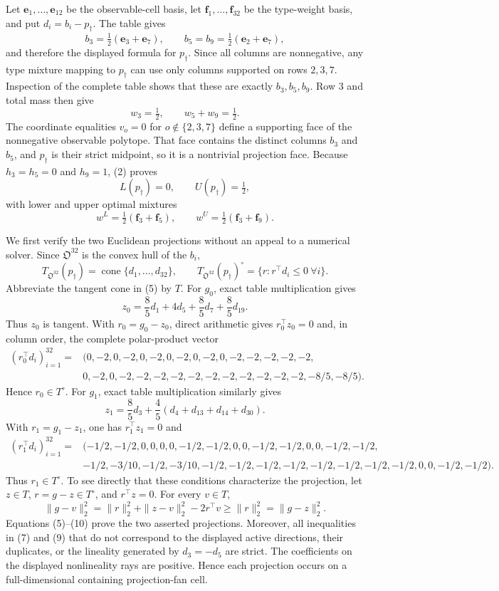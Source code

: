 Let \(\mathbf e_1,\ldots,\mathbf e_{12}\) be the observable-cell basis, let \(\mathbf f_1,\ldots,\mathbf f_{32}\) be the type-weight basis, and put \(d_i=b_i-p_\dagger\).  The table gives
\[
b_3=\tfrac12(\mathbf e_3+\mathbf e_7),
\qquad
b_5=b_9=\tfrac12(\mathbf e_2+\mathbf e_7),
\tag{1}
\]
and therefore the displayed formula for \(p_\dagger\).  Since all columns are nonnegative, any type mixture mapping to \(p_\dagger\) can use only columns supported on rows \(2,3,7\).  Inspection of the complete table shows that these are exactly \(b_3,b_5,b_9\).  Row \(3\) and total mass then give
\[
w_3=\tfrac12,\qquad w_5+w_9=\tfrac12.
\tag{2}
\]
The coordinate equalities \(v_o=0\) for \(o\notin\{2,3,7\}\) define a supporting face of the nonnegative observable polytope.  That face contains the distinct columns \(b_3\) and \(b_5\), and \(p_\dagger\) is their strict midpoint, so it is a nontrivial projection face.
Because \(h_3=h_5=0\) and \(h_9=1\), (2) proves
\[
L(p_\dagger)=0,\qquad U(p_\dagger)=\tfrac12,
\tag{3}
\]
with lower and upper optimal mixtures
\[
w^L=\tfrac12(\mathbf f_3+\mathbf f_5),
\qquad
w^U=\tfrac12(\mathbf f_3+\mathbf f_9).
\tag{4}
\]

We first verify the two Euclidean projections without an appeal to a numerical solver.  Since \(\mathfrak O^{32}\) is the convex hull of the \(b_i\),
\[
T_{\mathfrak O^{32}}(p_\dagger)=\operatorname{cone}\{d_1,\ldots,d_{32}\},
\qquad
T_{\mathfrak O^{32}}(p_\dagger)^\circ
=\{r:r^{\top}d_i\leq0\ \forall i\}.
\tag{5}
\]
Abbreviate the tangent cone in (5) by \(T\).
For \(g_0\), exact table multiplication gives
\[
z_0=\frac85d_1+4d_5+\frac85d_7+\frac85d_{19}.
\tag{6}
\]
Thus \(z_0\) is tangent.  With \(r_0=g_0-z_0\), direct arithmetic gives \(r_0^{\top}z_0=0\) and, in column order, the complete polar-product vector
\[
\begin{split}
(r_0^{\top}d_i)_{i=1}^{32}={}&(0,-2,0,-2,0,-2,0,-2,
0,-2,0,-2,-2,-2,-2,-2,\\
&0,-2,0,-2,-2,-2,-2,-2,-2,-2,-2,-2,-2,-2,-8/5,-8/5).
\end{split}
\tag{7}
\]
Hence \(r_0\in T^\circ\).  For \(g_1\), exact table multiplication similarly gives
\[
z_1=\frac85d_3+\frac45(d_4+d_{13}+d_{14}+d_{30}).
\tag{8}
\]
With \(r_1=g_1-z_1\), one has \(r_1^{\top}z_1=0\) and
\[
\begin{split}
(r_1^{\top}d_i)_{i=1}^{32}={}&(-1/2,-1/2,0,0,0,0,-1/2,-1/2,
0,0,-1/2,-1/2,0,0,-1/2,-1/2,\\
&-1/2,-3/10,-1/2,-3/10,-1/2,-1/2,-1/2,-1/2,
-1/2,-1/2,-1/2,-1/2,0,0,-1/2,-1/2).
\end{split}
\tag{9}
\]
Thus \(r_1\in T^\circ\).  To see directly that these conditions characterize the projection, let \(z\in T\), \(r=g-z\in T^\circ\), and \(r^{\top}z=0\).  For every \(v\in T\),
\[
\|g-v\|_2^2
=\|r\|_2^2+\|z-v\|_2^2-2r^{\top}v
\geq\|r\|_2^2=\|g-z\|_2^2.
\tag{10}
\]
Equations (5)--(10) prove the two asserted projections.  Moreover, all inequalities in (7) and (9) that do not correspond to the displayed active directions, their duplicates, or the lineality generated by \(d_3=-d_5\) are strict.  The coefficients on the displayed nonlineality rays are positive.  Hence each projection occurs on a full-dimensional containing projection-fan cell.

